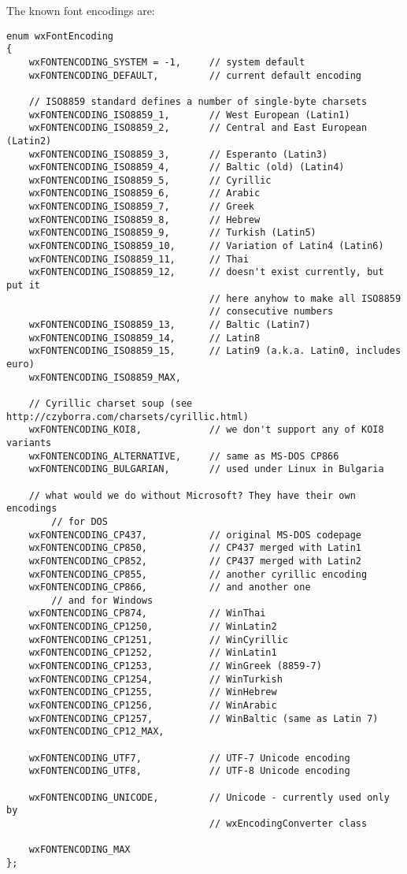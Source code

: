 The known font encodings are:

\begin{verbatim}
enum wxFontEncoding
{
    wxFONTENCODING_SYSTEM = -1,     // system default
    wxFONTENCODING_DEFAULT,         // current default encoding

    // ISO8859 standard defines a number of single-byte charsets
    wxFONTENCODING_ISO8859_1,       // West European (Latin1)
    wxFONTENCODING_ISO8859_2,       // Central and East European (Latin2)
    wxFONTENCODING_ISO8859_3,       // Esperanto (Latin3)
    wxFONTENCODING_ISO8859_4,       // Baltic (old) (Latin4)
    wxFONTENCODING_ISO8859_5,       // Cyrillic
    wxFONTENCODING_ISO8859_6,       // Arabic
    wxFONTENCODING_ISO8859_7,       // Greek
    wxFONTENCODING_ISO8859_8,       // Hebrew
    wxFONTENCODING_ISO8859_9,       // Turkish (Latin5)
    wxFONTENCODING_ISO8859_10,      // Variation of Latin4 (Latin6)
    wxFONTENCODING_ISO8859_11,      // Thai
    wxFONTENCODING_ISO8859_12,      // doesn't exist currently, but put it
                                    // here anyhow to make all ISO8859
                                    // consecutive numbers
    wxFONTENCODING_ISO8859_13,      // Baltic (Latin7)
    wxFONTENCODING_ISO8859_14,      // Latin8
    wxFONTENCODING_ISO8859_15,      // Latin9 (a.k.a. Latin0, includes euro)
    wxFONTENCODING_ISO8859_MAX,

    // Cyrillic charset soup (see http://czyborra.com/charsets/cyrillic.html)
    wxFONTENCODING_KOI8,            // we don't support any of KOI8 variants
    wxFONTENCODING_ALTERNATIVE,     // same as MS-DOS CP866
    wxFONTENCODING_BULGARIAN,       // used under Linux in Bulgaria

    // what would we do without Microsoft? They have their own encodings
        // for DOS
    wxFONTENCODING_CP437,           // original MS-DOS codepage
    wxFONTENCODING_CP850,           // CP437 merged with Latin1
    wxFONTENCODING_CP852,           // CP437 merged with Latin2
    wxFONTENCODING_CP855,           // another cyrillic encoding
    wxFONTENCODING_CP866,           // and another one
        // and for Windows
    wxFONTENCODING_CP874,           // WinThai
    wxFONTENCODING_CP1250,          // WinLatin2
    wxFONTENCODING_CP1251,          // WinCyrillic
    wxFONTENCODING_CP1252,          // WinLatin1
    wxFONTENCODING_CP1253,          // WinGreek (8859-7)
    wxFONTENCODING_CP1254,          // WinTurkish
    wxFONTENCODING_CP1255,          // WinHebrew
    wxFONTENCODING_CP1256,          // WinArabic
    wxFONTENCODING_CP1257,          // WinBaltic (same as Latin 7)
    wxFONTENCODING_CP12_MAX,

    wxFONTENCODING_UTF7,            // UTF-7 Unicode encoding
    wxFONTENCODING_UTF8,            // UTF-8 Unicode encoding

    wxFONTENCODING_UNICODE,         // Unicode - currently used only by
                                    // wxEncodingConverter class

    wxFONTENCODING_MAX
};
\end{verbatim}

